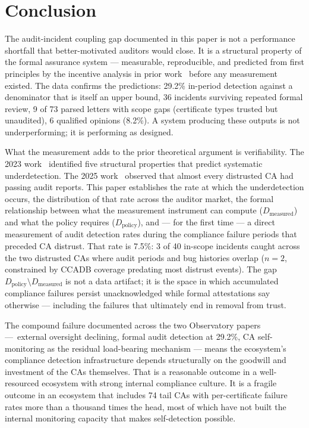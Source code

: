 \documentclass[10pt,twocolumn,letterpaper]{article}
\begin{document}
\section{Conclusion}
\label{sec:conclusion}

The audit-incident coupling gap documented in this paper is not a
performance shortfall that better-motivated auditors would close.
It is a structural property of the formal assurance system ---
measurable, reproducible, and predicted from first principles by the
incentive analysis in prior work~\cite{hurst2023, hurst2025} before
any measurement existed. The data confirms the predictions: 29.2\%
in-period detection against a denominator that is itself an upper
bound, 36 incidents surviving repeated formal review, 9 of 73 parsed letters
with scope gaps (certificate types trusted but unaudited), 6 qualified opinions (8.2\%).
A system producing these outputs is not underperforming; it is
performing as designed.

What the measurement adds to the prior theoretical argument is
verifiability. The 2023 work~\cite{hurst2023} identified five
structural properties that predict systematic underdetection. The 2025
work~\cite{hurst2025} observed that almost every distrusted CA had passing
audit reports. This paper establishes the rate at which the underdetection
occurs, the distribution of that rate across the auditor market, the
formal relationship between what the measurement instrument can
compute ($D_\text{measured}$) and what the policy requires
($D_\text{policy}$), and --- for the first time --- a direct measurement
of audit detection rates during the compliance failure periods that
preceded CA distrust. That rate is 7.5\%: 3 of 40 in-scope incidents
caught across the two distrusted CAs where audit periods and bug
histories overlap ($n=2$, constrained by CCADB coverage predating
most distrust events). The gap $D_\text{policy} \setminus D_\text{measured}$
is not a data artifact; it is the space in which accumulated compliance
failures persist unacknowledged while formal attestations say otherwise
--- including the failures that ultimately end in removal from trust.

The compound failure documented across the two Observatory papers~\cite{sister}
---~external oversight declining, formal audit detection at 29.2\%,
CA self-monitoring as the residual load-bearing mechanism --- means the
ecosystem's compliance detection infrastructure depends structurally
on the goodwill and investment of the CAs themselves. That is a
reasonable outcome in a well-resourced ecosystem with strong internal
compliance culture. It is a fragile outcome in an ecosystem that
includes 74 tail CAs with per-certificate failure rates more than a
thousand times the head, most of which have not built the internal
monitoring capacity that makes self-detection possible.
\end{document}
